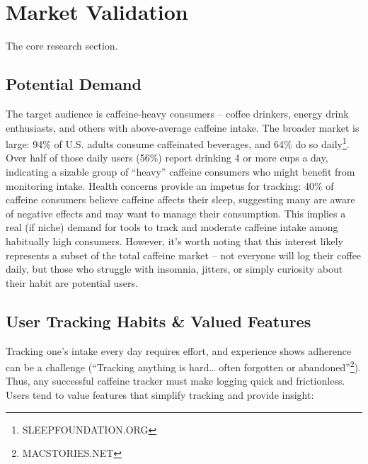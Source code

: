 \documentclass{article}
\begin{document}
\section{Market Validation}
The core research section.

\subsection{Potential Demand}
The target audience is caffeine-heavy consumers – coffee drinkers, energy drink enthusiasts, and others with above-average caffeine intake. The broader market is large: 94\% of U.S. adults consume caffeinated beverages, and 64\% do so daily\footnote{SLEEPFOUNDATION.ORG}. Over half of those daily users (56\%) report drinking 4 or more cups a day\footnotemark[1], indicating a sizable group of “heavy” caffeine consumers who might benefit from monitoring intake. Health concerns provide an impetus for tracking: 40\% of caffeine consumers believe caffeine affects their sleep\footnotemark[1], suggesting many are aware of negative effects and may want to manage their consumption. This implies a real (if niche) demand for tools to track and moderate caffeine intake among habitually high consumers. However, it’s worth noting that this interest likely represents a subset of the total caffeine market – not everyone will log their coffee daily, but those who struggle with insomnia, jitters, or simply curiosity about their habit are potential users.

\subsection{User Tracking Habits \& Valued Features}
Tracking one’s intake every day requires effort, and experience shows adherence can be a challenge (“Tracking anything is hard… often forgotten or abandoned”\footnote{MACSTORIES.NET}). Thus, any successful caffeine tracker must make logging quick and frictionless. Users tend to value features that simplify tracking and provide insight:
\end{document}
